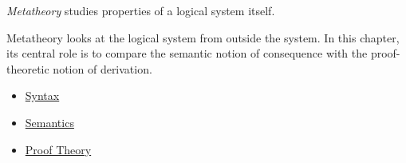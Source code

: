 \begin{definition}[Metatheory]
\label{def:propositional-logic-metatheory}
\emph{Metatheory} studies properties of a logical system itself.
\end{definition}

\begin{remark*}[Interpretation]
Metatheory looks at the logical system from outside the system. In this
chapter, its central role is to compare the semantic notion of consequence
with the proof-theoretic notion of derivation.
\end{remark*}

\begin{dependencies}
\begin{itemize}
  \item \hyperref[def:propositional-logic-syntax]{Syntax}
  \item \hyperref[def:propositional-logic-semantics]{Semantics}
  \item \hyperref[def:propositional-logic-proof-theory]{Proof Theory}
\end{itemize}
\end{dependencies}

